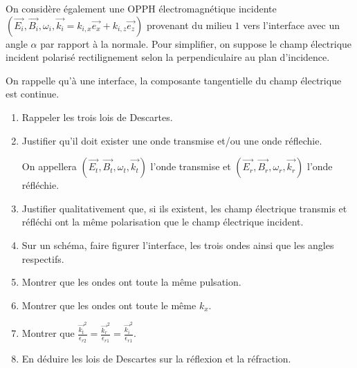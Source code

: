 On considère également une OPPH électromagnétique incidente $(\vec{E_i}, \vec{B_i}, \omega_i, \vec{k_i} = k_{i,x}\vec{e_x} + k_{i, z}\vec{e_z})$ provenant du milieu $1$ vers l'interface avec un angle $\alpha$ par rapport à la normale. Pour simplifier, on suppose le champ électrique incident polarisé rectilignement selon la perpendiculaire au plan d'incidence.

On rappelle qu'à une interface, la composante tangentielle du champ électrique est continue.

\begin{enumerate}
	\item Rappeler les trois lois de Descartes.
	
	\item Justifier qu'il doit exister une onde transmise et/ou une onde réflechie. 

	On appellera $(\vec{E_t}, \vec{B_t}, \omega_t, \vec{k_t})$ l'onde transmise et $(\vec{E_r}, \vec{B_r}, \omega_r, \vec{k_r})$ l'onde réfléchie. 
	
	\item Justifier qualitativement que, si ils existent, les champ électrique transmis et réfléchi ont la même polarisation que le champ électrique incident.
	
	\item Sur un schéma, faire figurer l'interface, les trois ondes ainsi que les angles respectifs.
	
	\item Montrer que les ondes ont toute la même pulsation.
	
	\item Montrer que les ondes ont toute le même $k_x$.
	
	\item Montrer que $\frac{\vec{k_t}^2}{\epsilon_{r2}} = \frac{\vec{k_r}^2}{\epsilon_{r1}} = \frac{\vec{k_i}^2}{\epsilon_{r1}}$.
	
	\item En déduire les lois de Descartes sur la réflexion et la réfraction.
\end{enumerate}




